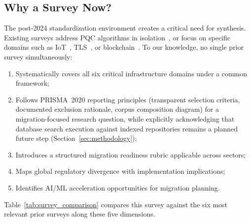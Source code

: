 \documentclass[journal]{IEEEtran}
\begin{document}
\subsection{Why a Survey Now?}

The post-2024 standardization environment creates a critical need for synthesis.
Existing surveys address PQC algorithms in isolation~\cite{bernstein2017postquantum,
nejatollahi2019post}, or focus on specific domains such as IoT~\cite{liu2021pqc},
TLS~\cite{stebila2020postquantum}, or blockchain~\cite{fernandezcarames2020review}.
To our knowledge, no single prior survey simultaneously:
\begin{enumerate}
  \item Systematically covers all six critical infrastructure domains under a common framework;
  \item Follows PRISMA~2020 reporting principles (transparent selection criteria,
  documented exclusion rationale, corpus composition diagram) for a
  migration-focused research question, while explicitly acknowledging that
  database search execution against indexed repositories remains a planned
  future step (Section~\ref{sec:methodology});
  \item Introduces a structured migration readiness rubric applicable across sectors;
  \item Maps global regulatory divergence with implementation implications;
  \item Identifies AI/ML acceleration opportunities for migration planning.
\end{enumerate}

Table~\ref{tab:survey_comparison} compares this survey against the six most
relevant prior surveys along these five dimensions.
\end{document}
